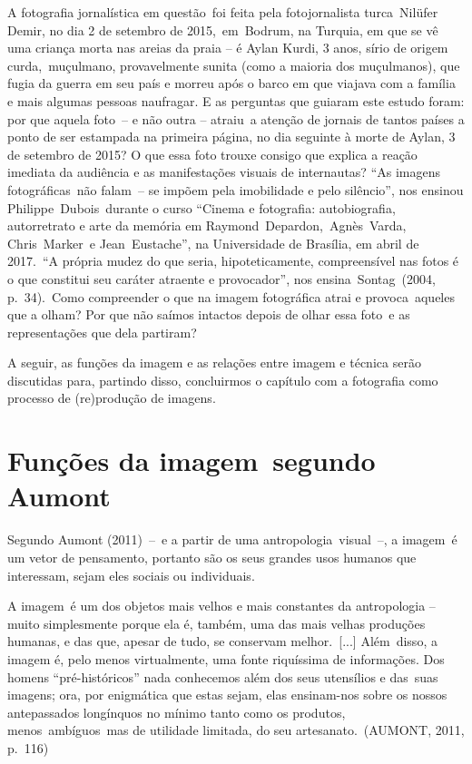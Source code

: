 \documentclass[
  letterpaper,
  a4paper,
  12pt]{scrbook}
\renewenvironment{quote}
  {\par\singlespacing\small\list{}{\rightmargin=0cm \leftmargin=4cm}%
   \item\relax}
  {\endlist}
\begin{document}
A fotografia jornalística em questão~foi feita pela fotojornalista
turca~Nilüfer Demir, no dia 2 de setembro de 2015,~em~Bodrum, na
Turquia, em que se vê uma criança morta nas areias da praia -- é Aylan
Kurdi, 3 anos, sírio de origem curda,~muçulmano, provavelmente sunita
(como a maioria dos muçulmanos), que fugia da guerra em seu país e
morreu após o barco em que viajava com a família e mais algumas pessoas
naufragar. E as perguntas que guiaram este estudo foram: por que aquela
foto~-- e não outra -- atraiu~a atenção de jornais de tantos países a
ponto de ser estampada na primeira página, no dia seguinte à morte de
Aylan, 3 de setembro de 2015? O que essa foto trouxe consigo que explica
a reação imediata da audiência e as manifestações visuais de
internautas? ``As imagens fotográficas~não falam~-- se impõem pela
imobilidade e pelo silêncio'', nos ensinou Philippe~Dubois~durante o
curso ``Cinema e fotografia: autobiografia, autorretrato e arte da
memória em Raymond~Depardon,~Agnès~Varda, Chris~Marker~e
Jean~Eustache'', na Universidade de Brasília, em abril de 2017.~``A
própria mudez do que seria, hipoteticamente, compreensível nas fotos é o
que constitui seu caráter atraente e provocador'', nos
ensina~Sontag~(2004, p.~34).~Como compreender o que na imagem
fotográfica atrai e provoca~aqueles que a olham? Por que não saímos
intactos depois de olhar essa foto~e as representações que dela
partiram?

A seguir, as funções da imagem e as relações entre imagem e técnica
serão discutidas para, partindo disso, concluirmos o capítulo com a
fotografia como processo de (re)produção de imagens.~ ~

\hypertarget{funuxe7uxf5es-da-imagem-segundo-aumont}{%
\section{Funções da imagem~segundo
Aumont~}\label{funuxe7uxf5es-da-imagem-segundo-aumont}}

Segundo Aumont (2011)~--~e a partir de uma antropologia~visual~--, a
imagem~é um vetor de pensamento, portanto são os seus grandes usos
humanos que interessam, sejam eles sociais ou individuais.~ ~

\begin{quote}
A imagem~é um dos objetos mais velhos e mais constantes da antropologia
-- muito simplesmente porque ela é, também, uma das mais velhas
produções humanas, e das que, apesar de tudo, se conservam
melhor.~{[}...{]} Além~disso, a imagem é, pelo menos virtualmente, uma
fonte riquíssima de informações. Dos homens ``pré-históricos'' nada
conhecemos além dos seus utensílios e das~suas imagens; ora, por
enigmática que estas sejam, elas ensinam-nos sobre os nossos
antepassados longínquos no mínimo tanto como os produtos,
menos~ambíguos~mas de utilidade limitada, do seu artesanato.~(AUMONT,
2011, p.~116)~ ~
\end{quote}
\end{document}
